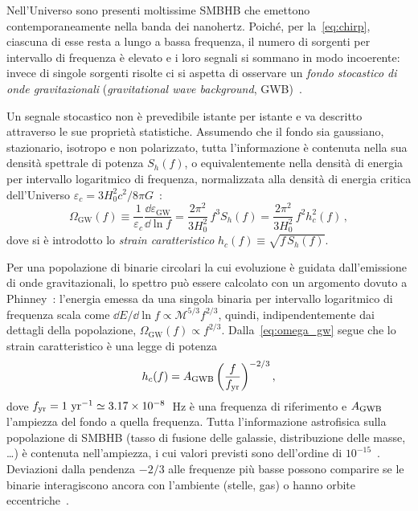Nell'Universo sono presenti moltissime SMBHB che emettono contemporaneamente nella banda dei nanohertz. Poiché, per la~\eqref{eq:chirp}, ciascuna di esse resta a lungo a bassa frequenza, il numero di sorgenti per intervallo di frequenza è elevato e i loro segnali si sommano in modo incoerente: invece di singole sorgenti risolte ci si aspetta di osservare un \textit{fondo stocastico di onde gravitazionali} (\textit{gravitational wave background}, GWB)~\cite{Sesana2008, Taylor2021}.

Un segnale stocastico non è prevedibile istante per istante e va descritto attraverso le sue proprietà statistiche. Assumendo che il fondo sia gaussiano, stazionario, isotropo e non polarizzato, tutta l'informazione è contenuta nella sua densità spettrale di potenza $S_h(f)$, o equivalentemente nella densità di energia per intervallo logaritmico di frequenza, normalizzata alla densità di energia critica dell'Universo $\varepsilon_c = 3H_0^2c^2/8\pi G$~\cite{Taylor2021}:
\begin{equation}
    \Omega_{\mathrm{GW}}(f) \equiv \frac{1}{\varepsilon_c} \frac{\dd \varepsilon_{\mathrm{GW}}}{\dd \ln f} = \frac{2\pi^2}{3H_0^2}\, f^3 S_h(f) = \frac{2\pi^2}{3H_0^2}\, f^2 h_c^2(f)\, ,
    \label{eq:omega_gw}
\end{equation}
dove si è introdotto lo \textit{strain caratteristico} $h_c(f) \equiv \sqrt{f\,S_h(f)}$.

Per una popolazione di binarie circolari la cui evoluzione è guidata dall'emissione di onde gravitazionali, lo spettro può essere calcolato con un argomento dovuto a Phinney~\cite{Phinney2001}: l'energia emessa da una singola binaria per intervallo logaritmico di frequenza scala come $\dd E/\dd\ln f \propto \mathcal{M}^{5/3} f^{2/3}$, quindi, indipendentemente dai dettagli della popolazione, $\Omega_{\mathrm{GW}}(f) \propto f^{2/3}$. Dalla~\eqref{eq:omega_gw} segue che lo strain caratteristico è una legge di potenza
\begin{equation}
    h_c(f) = A_{\mathrm{GWB}} \left(\frac{f}{f_{\mathrm{yr}}}\right)^{-2/3} ,
    \label{eq:hc_powerlaw}
\end{equation}
dove $f_{\mathrm{yr}} = 1\ \mathrm{yr}^{-1} \simeq 3.17\times10^{-8}$~Hz è una frequenza di riferimento e $A_{\mathrm{GWB}}$ l'ampiezza del fondo a quella frequenza. Tutta l'informazione astrofisica sulla popolazione di SMBHB (tasso di fusione delle galassie, distribuzione delle masse, \dots) è contenuta nell'ampiezza, i cui valori previsti sono dell'ordine di $10^{-15}$~\cite{Sesana2008}. Deviazioni dalla pendenza $-2/3$ alle frequenze più basse possono comparire se le binarie interagiscono ancora con l'ambiente (stelle, gas) o hanno orbite eccentriche~\cite{Taylor2021}.

